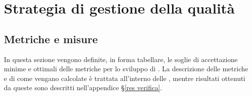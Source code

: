 \section{Strategia di gestione della qualità}
\label{strategie qualita}

	\subsection{Metriche e misure}
		\label{subsec:metriche}
		
		In questa sezione vengono definite, in forma tabellare, le soglie di accettazione minime 
		e ottimali delle metriche per lo sviluppo di \ProjectName{}. La descrizione delle 
		metriche e di come vengano calcolate è trattata all'interno	delle \vNormeDiProgetto{}, 
		mentre risultati ottenuti da queste sono descritti nell'appendice §\ref{res verifica}.\\

